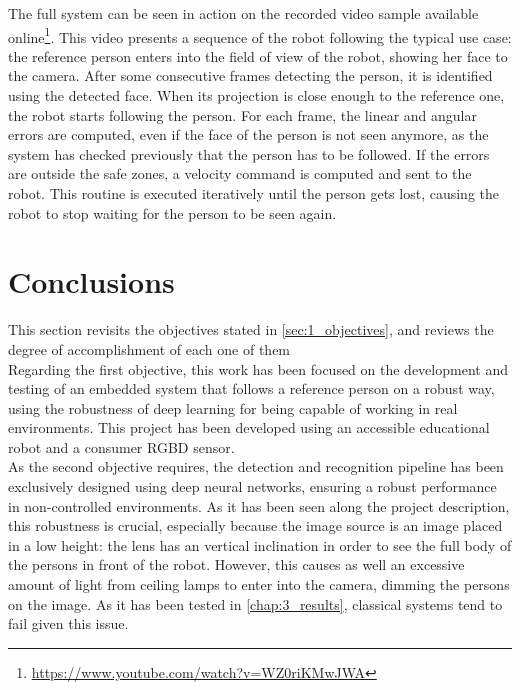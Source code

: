 The full system can be seen in action on the recorded video sample available online\footnote{\url{https://www.youtube.com/watch?v=WZ0riKMwJWA}}. This video presents a sequence of the robot following the typical use case: the reference person enters into the field of view of the robot, showing her face to the camera. After some consecutive frames detecting the person, it is identified using the detected face. When its projection is close enough to the reference one, the robot starts following the person. For each frame, the linear and angular errors are computed, even if the face of the person is not seen anymore, as the system has checked previously that the person has to be followed. If the errors are outside the safe zones, a velocity command is computed and sent to the robot. This routine is executed iteratively until the person gets lost, causing the robot to stop waiting for the person to be seen again.



\section{Conclusions}

This section revisits the objectives stated in \autoref{sec:1_objectives}, and reviews the degree of accomplishment of each one of them\\

Regarding the first objective, this work has been focused on the development and testing of an embedded system that follows a reference person on a robust way, using the robustness of deep learning for being capable of working in real environments. This project has been developed using an accessible educational robot and a consumer RGBD sensor.\\

As the second objective requires, the detection and recognition pipeline has been exclusively designed using deep neural networks, ensuring a robust performance in non-controlled environments. As it has been seen along the project description, this robustness is crucial, especially because the image source is an image placed in a low height: the lens has an vertical inclination in order to see the full body of the persons in front of the robot. However, this causes as well an excessive amount of light from ceiling lamps to enter into the camera, dimming the persons on the image. As it has been tested in \autoref{chap:3_results}, classical systems tend to fail given this issue.\\


